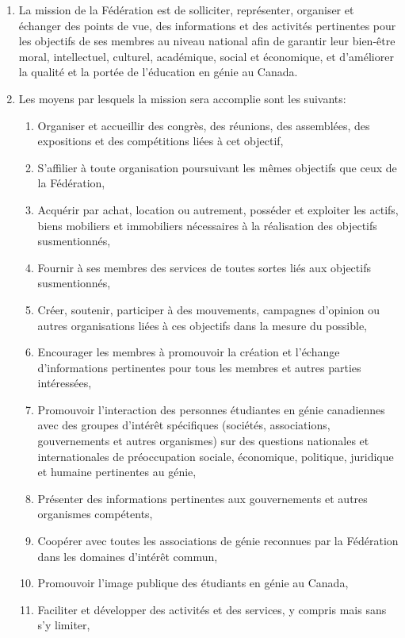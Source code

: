 \begin{enumerate}
 \item
  La mission de la Fédération est de solliciter, représenter, organiser et échanger des points de vue, des informations et des activités pertinentes pour les objectifs de ses membres au niveau national afin de garantir leur bien-être moral, intellectuel, culturel, académique, social et économique, et d'améliorer la qualité et la portée de l'éducation en génie au Canada.
 \item
  Les moyens par lesquels la mission sera accomplie sont les suivants:

  \begin{enumerate}
   \item
    Organiser et accueillir des congrès, des réunions, des assemblées, des expositions et des compétitions liées à cet objectif,
   \item
    S'affilier à toute organisation poursuivant les mêmes objectifs que ceux de la Fédération,
   \item
    Acquérir par achat, location ou autrement, posséder et exploiter les actifs, biens mobiliers et immobiliers nécessaires à la réalisation des objectifs susmentionnés,
   \item
    Fournir à ses membres des services de toutes sortes liés aux objectifs susmentionnés,
   \item
    Créer, soutenir, participer à des mouvements, campagnes d'opinion ou autres organisations liées à ces objectifs dans la mesure du possible,
   \item
    Encourager les membres à promouvoir la création et l'échange d'informations pertinentes pour tous les membres et autres parties intéressées,
   \item
    Promouvoir l'interaction des personnes étudiantes en génie canadiennes avec des groupes d'intérêt spécifiques (sociétés, associations, gouvernements et autres organismes) sur des questions nationales et internationales de préoccupation sociale, économique, politique, juridique et humaine pertinentes au génie,
   \item
    Présenter des informations pertinentes aux gouvernements et autres organismes compétents,
   \item
    Coopérer avec toutes les associations de génie reconnues par la Fédération dans les domaines d'intérêt commun,
   \item
    Promouvoir l'image publique des étudiants en génie au Canada,
   \item
    Faciliter et développer des activités et des services, y compris mais sans s'y limiter,


\end{enumerate}
\end{enumerate}
